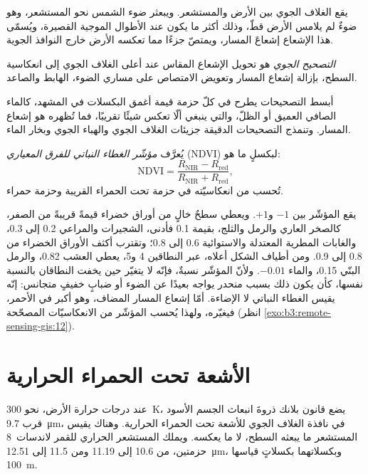 يقع الغلاف الجوي بين الأرض والمستشعر. ويبعثر
ضوء الشمس نحو المستشعر، وهو ضوءٌ لم يلامس الأرض قطّ، وذلك أكثر ما يكون عند
الأطوال الموجية القصيرة، ويُسمّى هذا الإشعاع إشعاعَ المسار، ويمتصّ جزءًا مما
تعكسه الأرض خارج النوافذ الجوية.

\begin{definition}\label{def:b3:remote-sensing-gis:atm-correction}
\emph{التصحيح الجوي} هو
تحويل الإشعاع المقاس عند أعلى الغلاف الجوي إلى
انعكاسية السطح، بإزالة إشعاع المسار وتعويض
الامتصاص على مساري الضوء، الهابط والصاعد.
\end{definition}

أبسط التصحيحات يطرح في كلّ حزمة قيمة أغمق
البكسلات في المشهد، كالماء الصافي العميق أو الظلّ، والتي ينبغي ألّا تعكس
شيئًا تقريبًا، فما تُظهره هو إشعاع المسار. وتنمذج التصحيحات الدقيقة
جزيئات الغلاف الجوي والهباء الجوي وبخار الماء.

\begin{definition}\label{def:b3:remote-sensing-gis:ndvi}
يُعرَّف \emph{مؤشّر الغطاء النباتي للفرق
المعياري} (NDVI) لبكسلٍ ما هو:
\[
\mathrm{NDVI} = \frac{R_\mathrm{NIR} - R_\mathrm{red}}{R_\mathrm{NIR} + R_\mathrm{red}} ,
\]
تُحسب من انعكاسيّته في حزمة تحت الحمراء القريبة وحزمة حمراء.
\end{definition}

يقع المؤشّر بين $-1$ و$+1$. ويعطي سطحٌ خالٍ من أوراق خضراء
قيمةً قريبةً من الصفر، كالصخر العاري والرمل والثلج، بقيمة \num{0.1} فأدنى،
الشجيرات والمراعي 0.2 إلى 0.3، والغابات المطرية المعتدلة والاستوائية 0.6 إلى
0.8؛ وتقترب أكثف الأوراق الخضراء من 0.8 إلى 0.9. ومن أطياف الشكل
أعلاه، عبر النطاقين 4 و5، يعطي العشب 0.82، والرمل البنّي
0.15، والماء $-0.01$. ولأنّ المؤشّر نسبةٌ، فإنّه لا يتغيّر حين
يخفت النطاقان بالنسبة نفسها، كأن يكون ذلك بسبب منحدر يواجه بعيدًا عن
الضوء أو ضبابٍ خفيفٍ متجانس: إنّه يقيس الغطاء النباتي لا
الإضاءة. أمّا إشعاع المسار المضاف، وهو أكبر في الأحمر، فيغيّره،
ولهذا يُحسب المؤشّر من الانعكاسيّات المصحّحة
(انظر \cref{exo:b3:remote-sensing-gis:12}).

\section{الأشعة تحت الحمراء الحرارية}\label{sec:b3:remote-sensing-gis:thermal}

عند درجات حرارة الأرض، نحو \qty{300}{K}، يضع قانون بلانك
ذروةَ انبعاث الجسم الأسود قرب \qty{9.7}{\micro\metre}، في
نافذة الغلاف الجوي للأشعة تحت الحمراء الحرارية. وهناك يقيس المستشعر ما
يبعثه السطح، لا ما يعكسه. ويملك المستشعر الحراري للقمر لاندسات~8
حزمتين، من 10.6 إلى 11.19 ومن 11.5 إلى \qty{12.51}{\micro\metre}، وبكسلاتهما
بكسلاتٍ قياسها \qty{100}{m}.

